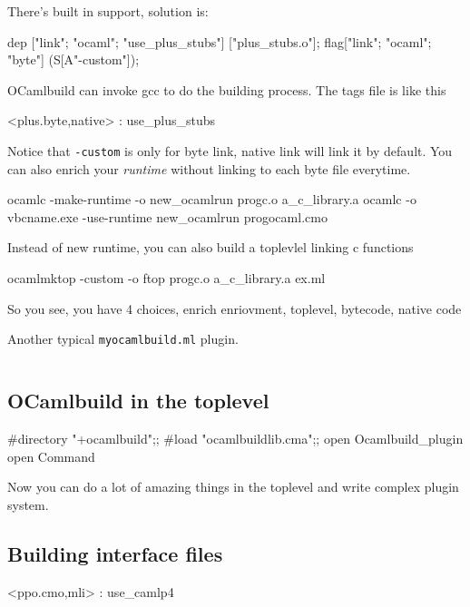 There's built in support, solution is:

\begin{ocamlcode}
    dep ["link"; "ocaml"; "use_plus_stubs"] ["plus_stubs.o"];
    flag["link"; "ocaml"; "byte"] (S[A"-custom"]);
\end{ocamlcode}
OCamlbuild can invoke gcc to do the building process. The tags file is
like this

\begin{bluetext}
<plus.{byte,native}> : use_plus_stubs  
\end{bluetext}
Notice that \verb|-custom| is only for byte link, native link will
link it by default. You can also enrich your \textit{runtime} without
linking to each byte file everytime.

\begin{bashcode}
  ocamlc -make-runtime -o new_ocamlrun progc.o a_c_library.a
  ocamlc -o vbcname.exe -use-runtime new_ocamlrun progocaml.cmo
\end{bashcode}
Instead of new runtime, you can also build a toplevlel linking c
functions

\begin{bashcode}
  ocamlmktop -custom -o ftop progc.o a_c_library.a ex.ml
\end{bashcode}
So you see, you have 4 choices, enrich enriovment, toplevel, bytecode,
native code


Another typical \verb|myocamlbuild.ml| plugin.
\label{myocamlbuild}
\inputminted[fontsize=\scriptsize]{ocaml}{/Users/bobzhang1988/myocamlbuild/myocamlbuild.ml}


\subsection{OCamlbuild in the toplevel }

\begin{ocamlcode}
#directory "+ocamlbuild";;
#load "ocamlbuildlib.cma";;
open Ocamlbuild_plugin
open Command 
\end{ocamlcode}

Now you can do a lot of amazing things in the toplevel and write
complex plugin system.

\subsection{Building interface files}

\begin{bashcode}
<ppo.{cmo,mli}> : use_camlp4
\end{bashcode}

